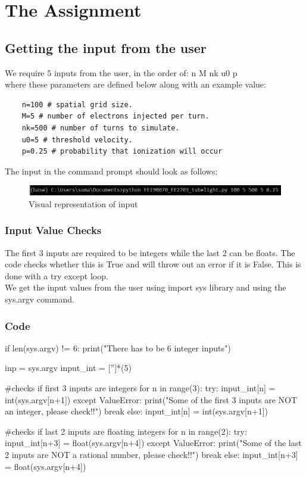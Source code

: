 \documentclass[11pt]{article}
\begin{document}
\section{The Assignment}
\subsection{Getting the input from the user}
We require 5 inputs from the user, in the order of: n M nk u0 p\\
where these parameters are defined below along with an example value:

\begin{verbatim}
    n=100 # spatial grid size.
    M=5 # number of electrons injected per turn.
    nk=500 # number of turns to simulate.
    u0=5 # threshold velocity.
    p=0.25 # probability that ionization will occur
\end{verbatim}

The input in the command prompt should look as follows:
\begin{figure}[H]
    \centering
    \includegraphics[scale = 1]{ss1.jpg}
    \caption{Visual representation of input}
\end{figure}

\subsubsection{Input Value Checks}
The first 3 inputs are required to be integers while the last 2 can be floats. The code checks whether this is True and will throw out an error if it is False. This is done with a try except loop.\\

We get the input values from the user using import sys library and using the sys.argv command.


\subsubsection{Code}
\begin{python}
if len(sys.argv) != 6:
	print("There has to be 6 integer inputs")

inp = sys.argv
input_int = ['']*(5)

#checks if first 3 inputs are integers
for n in range(3):
	try:
		input_int[n] = int(sys.argv[n+1])
	except ValueError:
	    print("Some of the first 3 inputs are NOT an integer, please check!!")
	    break
	else:
		input_int[n] = int(sys.argv[n+1])

#checks if last 2 inputs are floating integers
for n in range(2):
	try:
		input_int[n+3] = float(sys.argv[n+4])
	except ValueError:
	    print("Some of the last 2 inputs are NOT a rational number, please check!!")
	    break
	else:
		input_int[n+3] = float(sys.argv[n+4])
\end{python}
\end{document}
